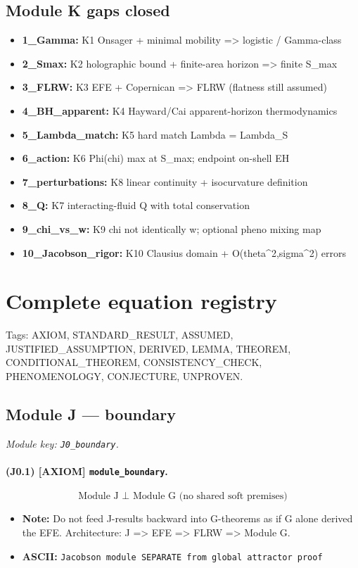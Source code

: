 \documentclass[11pt,a4paper]{article}
\theoremstyle{remark}\newtheorem*{caution}{Caution}
\newcommand{\tagbox}[1]{\textsc{[#1]}}
\begin{document}
\subsection{Module K gaps closed}
\begin{itemize}
\item \textbf{1\_Gamma:} K1 Onsager + minimal mobility => logistic / Gamma-class
\item \textbf{2\_Smax:} K2 holographic bound + finite-area horizon => finite S\_max
\item \textbf{3\_FLRW:} K3 EFE + Copernican => FLRW (flatness still assumed)
\item \textbf{4\_BH\_apparent:} K4 Hayward/Cai apparent-horizon thermodynamics
\item \textbf{5\_Lambda\_match:} K5 hard match Lambda = Lambda\_S
\item \textbf{6\_action:} K6 Phi(chi) max at S\_max; endpoint on-shell EH
\item \textbf{7\_perturbations:} K8 linear continuity + isocurvature definition
\item \textbf{8\_Q:} K7 interacting-fluid Q with total conservation
\item \textbf{9\_chi\_vs\_w:} K9 chi not identically w; optional pheno mixing map
\item \textbf{10\_Jacobson\_rigor:} K10 Clausius domain + O(theta^2,sigma^2) errors
\end{itemize}
\section{Complete equation registry}
Tags: AXIOM, STANDARD\_RESULT, ASSUMED, JUSTIFIED\_ASSUMPTION, DERIVED, LEMMA, THEOREM, CONDITIONAL\_THEOREM, CONSISTENCY\_CHECK, PHENOMENOLOGY, CONJECTURE, UNPROVEN.
\subsection{Module J --- boundary}
\textit{Module key: \texttt{J0\_boundary}.}
\paragraph{(J0.1) \tagbox{AXIOM} \texttt{module\_boundary}.}
\begin{equation}
\text{Module J $\perp$ Module G (no shared soft premises)}
\tag{J0.1}
\end{equation}
\begin{itemize}\setlength{\itemsep}{0.12em}
\item \textbf{Note:} Do not feed J-results backward into G-theorems as if G alone derived the EFE. Architecture: J => EFE => FLRW => Module G.
\item \textbf{ASCII:} \texttt{Jacobson module SEPARATE from global attractor proof}
\end{itemize}
\end{document}
